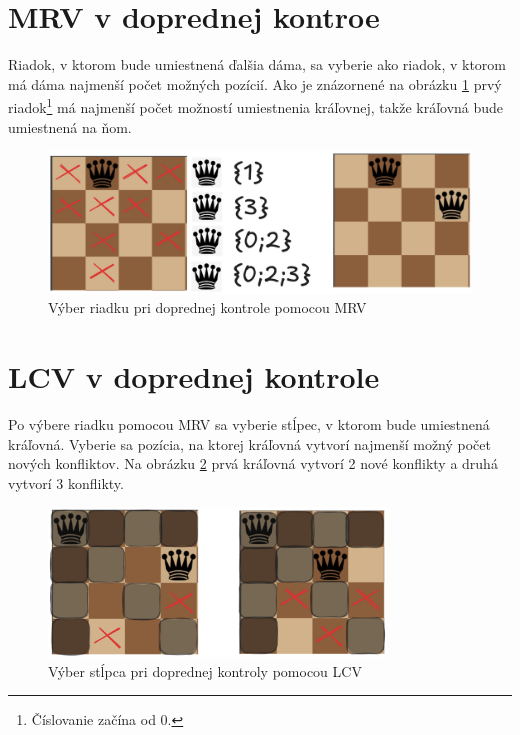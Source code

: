 \section{MRV v doprednej kontroe}
Riadok, v ktorom bude umiestnená ďalšia dáma, sa vyberie ako riadok, v ktorom má dáma najmenší počet možných pozícií. Ako je znázornené na obrázku \ref{fig:forward-checking-mrv} prvý riadok\footnote{Číslovanie začína od 0.} má najmenší počet možností umiestnenia kráľovnej, takže kráľovná bude umiestnená na ňom.
\begin{figure}
    \centering
    \includegraphics[width=1\textwidth]{figs/forward-checking/forward-checking-mrv}
    \caption{Výber riadku pri doprednej kontrole pomocou MRV}
    \label{fig:forward-checking-mrv}
\end{figure}

\section{LCV v doprednej kontrole}
Po výbere riadku pomocou MRV sa vyberie stĺpec, v ktorom bude umiestnená kráľovná. Vyberie sa pozícia, na ktorej kráľovná vytvorí najmenší možný počet nových konfliktov. Na obrázku \ref{fig:forward-checking-lcv} prvá kráľovná vytvorí 2 nové konflikty a druhá vytvorí 3 konflikty.
\begin{figure}
    \centering
    \includegraphics[width=0.8\textwidth]{figs/forward-checking/forward-checking-lcv}
    \caption{Výber stĺpca pri doprednej kontroly pomocou LCV}
    \label{fig:forward-checking-lcv}
\end{figure}

